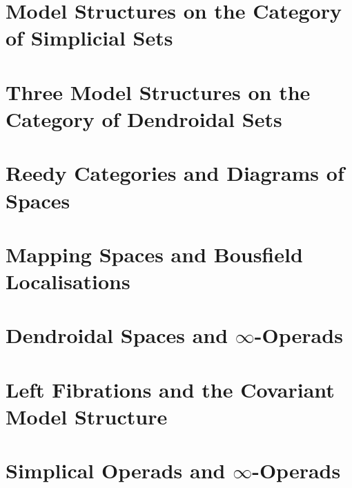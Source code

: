 \section{Model Structures on the Category of Simplicial Sets}

\section{Three Model Structures on the Category of Dendroidal Sets}

\section{Reedy Categories and Diagrams of Spaces}

\section{Mapping Spaces and Bousfield Localisations}

\section{Dendroidal Spaces and $\infty$-Operads}

\section{Left Fibrations and the Covariant Model Structure}

\section{Simplical Operads and $\infty$-Operads}